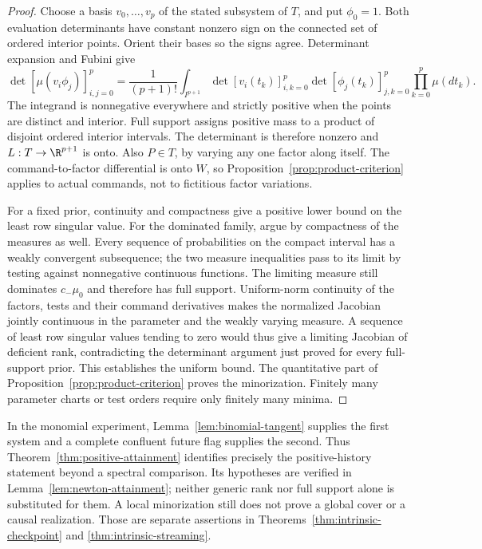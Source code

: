 \begin{proof}
Choose a basis $v_0,\ldots,v_p$ of the stated subsystem of $T$, and put
$\phi_0=1$. Both evaluation determinants have constant nonzero sign on
the connected set of ordered interior points. Orient their bases so the
signs agree. Determinant expansion and Fubini give
\[
 \det[\mu(v_i\phi_j)]_{i,j=0}^p
 =\frac1{(p+1)!}\int_{I^{p+1}}
       \det[v_i(t_k)]_{i,k=0}^p
       \det[\phi_j(t_k)]_{j,k=0}^p\prod_{k=0}^p\mu(dt_k).
\]
The integrand is nonnegative everywhere and strictly positive when the
points are distinct and interior. Full support assigns positive mass to
a product of disjoint ordered interior intervals. The determinant is
therefore nonzero and $L:T\to\R^{p+1}$ is onto. Also $P\in T$, by
varying any one factor along itself. The command-to-factor differential
is onto $W$, so Proposition~\ref{prop:product-criterion} applies to
actual commands, not to fictitious factor variations.

For a fixed prior, continuity and compactness give a positive lower
bound on the least row singular value. For the dominated family, argue
by compactness of the measures as well. Every sequence of probabilities
on the compact interval has a weakly convergent subsequence; the two
measure inequalities pass to its limit by testing against nonnegative
continuous functions. The limiting measure still dominates $c_-\mu_0$
and therefore has full support. Uniform-norm continuity of the factors,
tests and their command derivatives makes the normalized Jacobian jointly
continuous in the parameter and the weakly varying measure. A sequence
of least row singular values tending to zero would thus give a limiting
Jacobian of deficient rank, contradicting the determinant argument just
proved for every full-support prior. This establishes the uniform bound.
The quantitative part of
Proposition~\ref{prop:product-criterion} proves the minorization. Finitely
many parameter charts or test orders require only finitely many minima.
\end{proof}

In the monomial experiment, Lemma~\ref{lem:binomial-tangent} supplies the
first system and a complete confluent future flag supplies the second.
Thus Theorem~\ref{thm:positive-attainment} identifies precisely the
positive-history statement beyond a spectral comparison. Its hypotheses
are verified in Lemma~\ref{lem:newton-attainment}; neither generic rank
nor full support alone is substituted for them. A local minorization
still does not prove a global cover or a causal realization. Those are
separate assertions in Theorems~\ref{thm:intrinsic-checkpoint} and
\ref{thm:intrinsic-streaming}.

